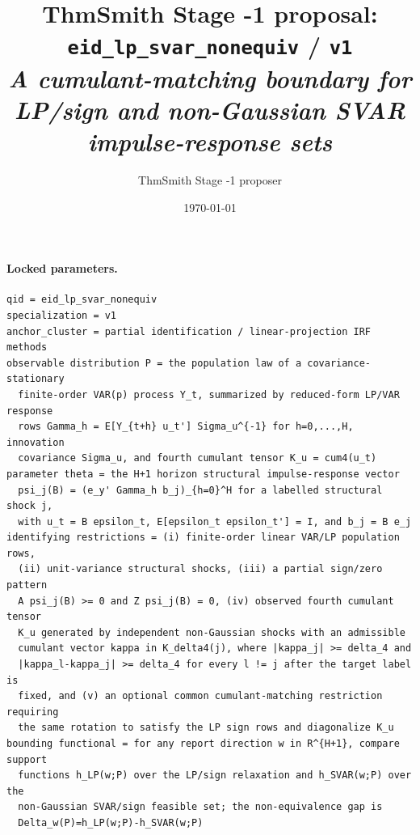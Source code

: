 \documentclass[11pt]{article}
\title{ThmSmith Stage -1 proposal: \texttt{eid\_lp\_svar\_nonequiv} / \texttt{v1}%
  \\ \large\textit{A cumulant-matching boundary for LP/sign and non-Gaussian SVAR impulse-response sets}}
\author{ThmSmith Stage -1 proposer}
\date{\today}
\theoremstyle{definition}
\theoremstyle{plain}
\theoremstyle{remark}
\begin{document}
\maketitle


\paragraph{Locked parameters.}
\begin{verbatim}
qid = eid_lp_svar_nonequiv
specialization = v1
anchor_cluster = partial identification / linear-projection IRF methods
observable distribution P = the population law of a covariance-stationary
  finite-order VAR(p) process Y_t, summarized by reduced-form LP/VAR response
  rows Gamma_h = E[Y_{t+h} u_t'] Sigma_u^{-1} for h=0,...,H, innovation
  covariance Sigma_u, and fourth cumulant tensor K_u = cum4(u_t)
parameter theta = the H+1 horizon structural impulse-response vector
  psi_j(B) = (e_y' Gamma_h b_j)_{h=0}^H for a labelled structural shock j,
  with u_t = B epsilon_t, E[epsilon_t epsilon_t'] = I, and b_j = B e_j
identifying restrictions = (i) finite-order linear VAR/LP population rows,
  (ii) unit-variance structural shocks, (iii) a partial sign/zero pattern
  A psi_j(B) >= 0 and Z psi_j(B) = 0, (iv) observed fourth cumulant tensor
  K_u generated by independent non-Gaussian shocks with an admissible
  cumulant vector kappa in K_delta4(j), where |kappa_j| >= delta_4 and
  |kappa_l-kappa_j| >= delta_4 for every l != j after the target label is
  fixed, and (v) an optional common cumulant-matching restriction requiring
  the same rotation to satisfy the LP sign rows and diagonalize K_u
bounding functional = for any report direction w in R^{H+1}, compare support
  functions h_LP(w;P) over the LP/sign relaxation and h_SVAR(w;P) over the
  non-Gaussian SVAR/sign feasible set; the non-equivalence gap is
  Delta_w(P)=h_LP(w;P)-h_SVAR(w;P)
\end{verbatim}
\end{document}
